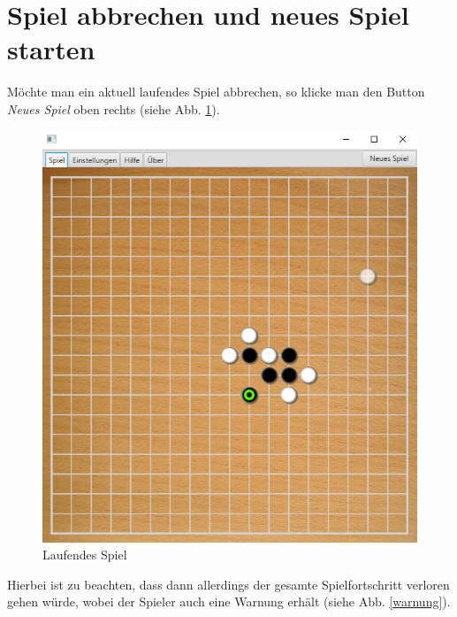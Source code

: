 \documentclass[11pt]{article}
\newcommand{\1}{{\mathds{1}}}
\newcommand{\imagewidth}{.6\textheight}%
\begin{document}
	\FloatBarrier
	\section{Spiel abbrechen und neues Spiel starten}
	
	Möchte man ein aktuell laufendes Spiel abbrechen, so klicke man den Button \textit{Neues Spiel} oben rechts (siehe Abb. \ref{spiel}).
	
	\begin{figure}[h]
		\centering
		\includegraphics[width=\imagewidth]{spiel.png}
		\caption{Laufendes Spiel}
		\label{spiel}
	\end{figure}
	
	Hierbei ist zu beachten, dass dann allerdings der gesamte Spielfortschritt verloren gehen würde, wobei der Spieler auch eine Warnung erhält (siehe Abb. \ref{warnung}).
	
\end{document}
